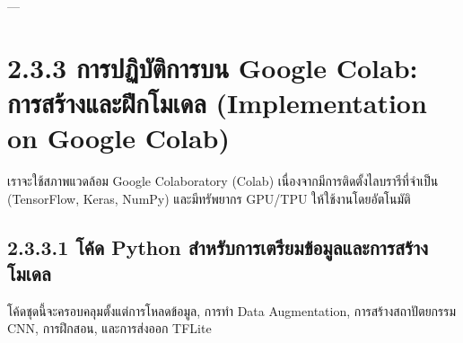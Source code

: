 \documentclass[11pt,a4paper,openany]{report}
\begin{document}
---

\section{2.3.3 การปฏิบัติการบน Google Colab: การสร้างและฝึกโมเดล (Implementation on Google Colab)}


เราจะใช้สภาพแวดล้อม Google Colaboratory (Colab) เนื่องจากมีการติดตั้งไลบรารีที่จำเป็น (TensorFlow, Keras, NumPy) และมีทรัพยากร GPU/TPU ให้ใช้งานโดยอัตโนมัติ

\subsection{2.3.3.1 โค้ด Python สำหรับการเตรียมข้อมูลและการสร้างโมเดล}


โค้ดชุดนี้จะครอบคลุมตั้งแต่การโหลดข้อมูล, การทำ Data Augmentation, การสร้างสถาปัตยกรรม CNN, การฝึกสอน, และการส่งออก TFLite
\end{document}
